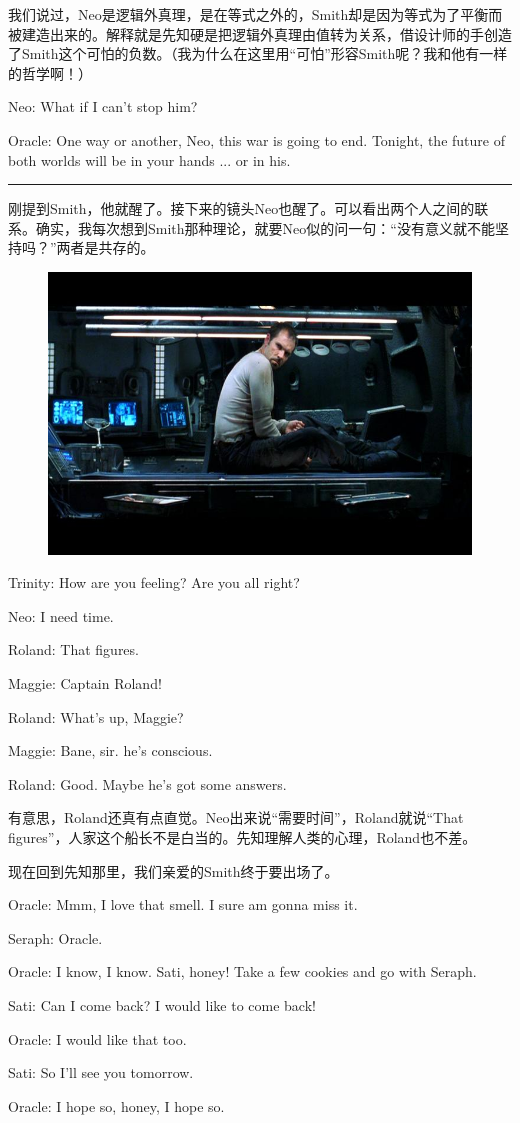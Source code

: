 \documentclass[UTF8]{ctexart}
\newcommand{\myparsep}{\noindent \rule[0.5ex]{\linewidth}{1pt}}
\newenvironment{myquote}{\color{green} \setlength{\leftskip}{6em} \setlength{\rightskip}{4em} \setlength{\parindent}{-2em}}{\par}
\begin{document}
我们说过，Neo是逻辑外真理，是在等式之外的，Smith却是因为等式为了平衡而被建造出来的。解释就是先知硬是把逻辑外真理由值转为关系，借设计师的手创造了Smith这个可怕的负数。（我为什么在这里用“可怕”形容Smith呢？我和他有一样的哲学啊！）

\begin{myquote}
Neo: What if I can't stop him?

Oracle: One way or another, Neo, this war is going to end. Tonight, the future of both worlds will be in your hands ... or in his.
\end{myquote}

\myparsep

刚提到Smith，他就醒了。接下来的镜头Neo也醒了。可以看出两个人之间的联系。确实，我每次想到Smith那种理论，就要Neo似的问一句：“没有意义就不能坚持吗？”两者是共存的。

\begin{figure}[htb]
\centering
\includegraphics[width=0.5\linewidth]{fig/04eda1ec7ef97f3d26979102.jpg}
\end{figure}

\begin{myquote}
Trinity: How are you feeling? Are you all right?

Neo: I need time.

Roland: That figures.

Maggie: Captain Roland!

Roland: What's up, Maggie?

Maggie: Bane, sir. he's conscious.

Roland: Good. Maybe he's got some answers.
\end{myquote}

有意思，Roland还真有点直觉。Neo出来说“需要时间”，Roland就说“That figures”，人家这个船长不是白当的。先知理解人类的心理，Roland也不差。

现在回到先知那里，我们亲爱的Smith终于要出场了。

\begin{myquote}
Oracle: Mmm, I love that smell. I sure am gonna miss it.

Seraph: Oracle.

Oracle: I know, I know. Sati, honey! Take a few cookies and go with Seraph.

Sati: Can I come back? I would like to come back!

Oracle: I would like that too.

Sati: So I'll see you tomorrow.

Oracle: I hope so, honey, I hope so.
\end{myquote}
\end{document}
